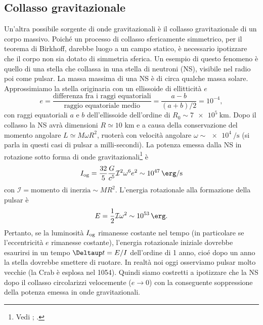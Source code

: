 \subsection{Collasso gravitazionale}
\label{sec:collasso-grav}

Un'altra possibile sorgente di onde gravitazionali è il collasso gravitazionale
di un corpo massivo.  Poiché un processo di collasso sfericamente simmetrico,
per il teorema di Birkhoff, darebbe luogo a un campo statico, è necessario
ipotizzare che il corpo non sia dotato di simmetria sferica.  Un esempio di
questo fenomeno è quello di una stella che collassa in una stella di neutroni
(NS), visibile nel radio poi come pulsar.  La massa massima di una NS è di circa
qualche massa solare.  Approssimiamo la stella originaria con un ellissoide di
ellitticità $e$
\begin{equation}
  e = \frac{\text{differenza fra i raggi equatoriali}}{\text{raggio equatoriale
      medio}}  = \frac{a-b}{(a+b)/2} = 10^{-4},
\end{equation}
con raggi equatoriali $a$ e $b$ dell'ellissoide dell'ordine di $R_{0} \sim
\SI{7e5}{\kilo\metre}$.  Dopo il collasso la NS avrà dimensioni $R \simeq 10$ km
e a causa della conservazione del momento angolare $L \simeq M \omega R^2$,
ruoterà con velocità angolare $\omega \sim
\SI[per-mode=reciprocal]{e4}{\per\second}$ (si parla in questi casi di pulsar a
milli-secondi).  La potenza emessa dalla NS in rotazione sotto forma di onde
gravitazionali\footnote{Vedi \textcite[488]{shapiro:black-holes};
  \textcite[272]{weinberg:gravitation}.} è
\begin{equation}
  I_{\textup{og}} = \frac{32}{5} \frac{G}{c^{5}} \mathcal{I}^{2} \omega^{6}
  e^{2} \sim \SI{e47}{\erg\per\second}
\end{equation}
con $\mathcal{I} = \text{momento di inerzia} \sim MR^{2}$.  L'energia
rotazionale alla formazione della pulsar è
\begin{equation}
  E = \frac{1}{2} \mathcal{I} \omega^{2} \sim \SI{e53}{\erg}.
\end{equation}
Pertanto, se la luminosità $I_{\textup{og}}$ rimanesse costante nel tempo (in
particolare se l'eccentricità $e$ rimanesse costante), l'energia rotazionale
iniziale dovrebbe esaurirsi in un tempo $\var t = E/I$ dell'ordine di 1 anno,
cio\'e dopo un anno la stella dovrebbe smettere di ruotare.  In realtà noi oggi
osserviamo pulsar molto vecchie (la Crab è esplosa nel 1054).  Quindi siamo
costretti a ipotizzare che la NS dopo il collasso circolarizzi velocemente ($e
\to 0$) con la conseguente soppressione della potenza emessa in onde
gravitazionali.

